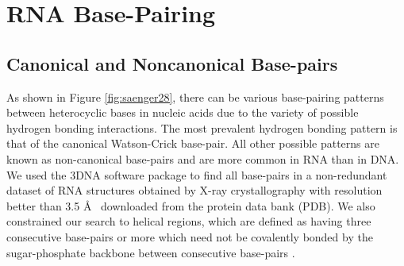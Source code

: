 \chapter{RNA Base-Pairing}
\label{basepairs} 

\section{Canonical and Noncanonical Base-pairs}
As  shown   in  Figure  \ref{fig:saenger28},  there   can  be  various
base-pairing patterns between heterocyclic  bases in nucleic acids due
to the  variety of possible  hydrogen bonding interactions.   The most
prevalent  hydrogen   bonding  pattern   is  that  of   the  canonical
Watson-Crick  base-pair.  All  other  possible patterns  are known  as
non-canonical base-pairs and  are more common in RNA  than in DNA.  We
used the 3DNA \cite{lu2003} software package to find all base-pairs in
a  non-redundant   dataset  of   RNA  structures  obtained   by  X-ray
crystallography with  resolution better than 3.5  \AA~ downloaded from
the  protein data  bank  (PDB).   We also  constrained  our search  to
helical  regions,  which  are  defined  as  having  three  consecutive
base-pairs  or  more  which  need  not be  covalently  bonded  by  the
sugar-phosphate     backbone     between    consecutive     base-pairs
\cite{olson2009}.

